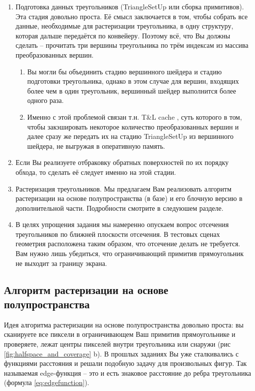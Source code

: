 \documentclass[12pt,subf,href,colorlinks=true]{article}
\begin{document}
\begin{enumerate}
\begin{enumerate}
\end{enumerate}
\item Подготовка данных треугольников (TriangleSetUp или сборка примитивов). Эта стадия довольно проста. Её смысл заключается в том, чтобы собрать все данные, необходимые для растеризации треугольника, в одну структуру, которая дальше передаётся по конвейеру. Поэтому всё, что Вы должны сделать -- прочитать три вершины треугольника по трём индексам из массива преобразованных вершин.

\begin{enumerate}
\item Вы могли бы объединить стадию вершинного шейдера и стадию подготовки треугольника, однако в этом случае для вершин, входящих более чем в один треугольник, вершинный шейдер выполнится более одного раза.

\item Именно с этой проблемой связан т.н. T\&L cache \cite{TnLCache}, суть которого в том, чтобы закэшировать некоторое количество преобразованных вершин и далее сразу же передать их на стадию TriangleSetUp из вершинного шейдера, не выгружая в оперативную память.
\end{enumerate}

\item Если Вы реализуете отбраковку обратных поверхностей по их порядку обхода, то сделать её следует именно на этой стадии.

\item Растеризация треугольников. Мы предлагаем Вам реализовать алгоритм растеризации на основе полупространства (в базе) и его блочную версию в дополнительной части. Подробности смотрите в следуюшем разделе.

\item В целях упрощения задания мы намеренно опускаем вопрос отсечения треугольников по ближней плоскости отсечения. В тестовых сценах геометрия расположена таким образом, что отсечение делать не требуется. Вам нужно лишь убедиться, что ограничивающий примитив прямоугольник не выходит за границу экрана.
\end{enumerate}


\subsection{Алгоритм растеризации на основе полупространства}

Идея алгоритма растеризации на основе полупространства довольно проста: вы сканируете все пиксели в ограничивающем Ваш примитив прямоугольнике и проверяете, лежат центры пикселей внутри треугольника или снаружи (рис \ref{fig:halfspace_and_coverage} b). В прошлых заданиях Вы уже сталкивались с функциями расстояния и решали подобную задачу для произвольных фигур. Так называемая edge-функция -- это и есть знаковое расстояние до ребра треугольника (формула \ref{eq:edgefunction}).
\end{document}
